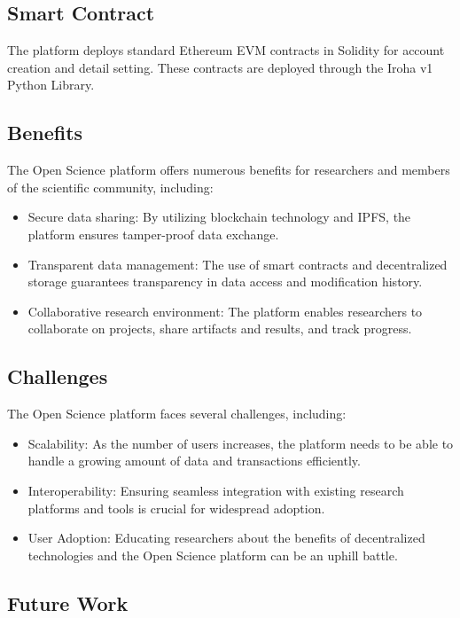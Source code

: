 \documentclass{article}
\begin{document}
\subsection{Smart Contract}

The platform deploys standard Ethereum EVM contracts in Solidity for account creation and detail setting. These contracts are deployed through the Iroha v1 Python Library.

\subsection{Benefits}

The Open Science platform offers numerous benefits for researchers and members of the scientific community, including:

\begin{itemize}
      \item Secure data sharing: By utilizing blockchain technology and IPFS, the platform ensures tamper-proof data exchange.
      \item Transparent data management: The use of smart contracts and decentralized storage guarantees transparency in data access and modification history.
      \item Collaborative research environment: The platform enables researchers to collaborate on projects, share artifacts and results, and track progress.
\end{itemize}

\subsection{Challenges}

The Open Science platform faces several challenges, including:

\begin{itemize}
      \item Scalability: As the number of users increases, the platform needs to be able to handle a growing amount of data and transactions efficiently.
      \item Interoperability: Ensuring seamless integration with existing research platforms and tools is crucial for widespread adoption.
      \item User Adoption: Educating researchers about the benefits of decentralized technologies and the Open Science platform can be an uphill battle.
\end{itemize}

\subsection{Future Work}
\end{document}
